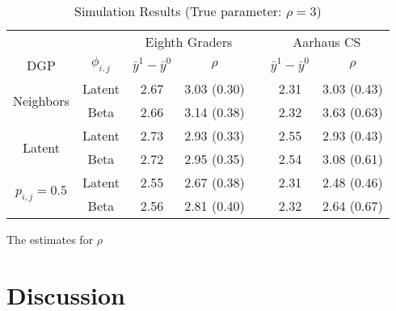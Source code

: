 \documentclass{article}
\begin{document}
\begin{table}[htbp]
  \caption{Simulation Results (True parameter: $\rho = 3$)}
  \label{sample-table}
  \centering
  \begin{tabular}{ccccccc}
    \toprule
    & & \multicolumn{2}{c}{Eighth Graders} & & \multicolumn{2}{c}{Aarhaus CS}              \\
    \cmidrule{3-4} \cmidrule{6-7}
    DGP & $\phi_{i,j}$ & $\bar{y}^1 - \bar{y}^0$ & $\rho$ & & $\bar{y}^1 - \bar{y}^0$ & $\rho$ \\
    \midrule
    \multirow{ 2}{*}{Neighbors} & Latent & 2.67 & 3.03 (0.30) & & 2.31 & 3.03 (0.43)    \\
    \cmidrule{2-7}
    & Beta & 2.66 & 3.14 (0.38) & & 2.32 & 3.63 (0.63)  \\
    \midrule
    \multirow{ 2}{*}{Latent}& Latent & 2.73 & 2.93 (0.33)  & & 2.55 & 2.93 (0.43)  \\
    \cmidrule{2-7}
    & Beta  & 2.72 & 2.95 (0.35)  & & 2.54 & 3.08 (0.61) \\
    \midrule
    \multirow{ 2}{*}{$p_{i,j} = 0.5$}& Latent & 2.55 & 2.67 (0.38)  & & 2.31 & 2.48 (0.46) \\
    \cmidrule{2-7} 
    & Beta  & 2.56 & 2.81 (0.40)  & & 2.32 & 2.64 (0.67)  \\
    \bottomrule
  \end{tabular}
\end{table}
The estimates for $\rho$

\section{Discussion}















\end{document}
